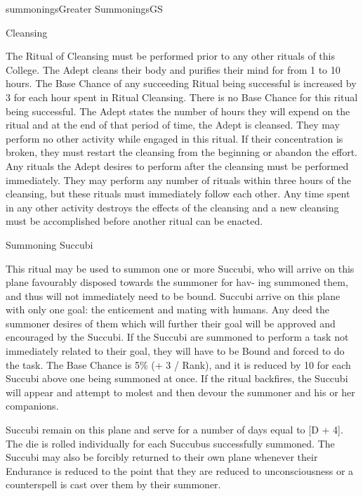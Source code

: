 \begin{College}[1.0]{summonings}{Greater Summonings}{GS}
\begin{ritual}[Q-1]{Cleansing}
\begin{effects}
The Ritual of Cleansing must be performed prior to any other rituals
of this College.  The Adept cleans their body and purifies their mind
for from 1 to 10 hours.  The Base Chance of any succeeding Ritual
being successful is increased by 3 for each hour spent in Ritual
Cleansing. There is no Base Chance for this ritual being successful.
The Adept states the number of hours they will expend on the ritual
and at the end of that period of time, the Adept is cleansed. They may
perform no other activity while engaged in this ritual.  If their
concentration is broken, they must restart the cleansing from the
beginning or abandon the effort.  Any rituals the Adept desires to
perform after the cleansing must be performed immediately.  They may
perform any number of rituals within three hours of the cleansing, but
these rituals must immediately follow each other. Any time spent in
any other activity destroys the effects of the cleansing and a new
cleansing must be accomplished before another ritual can be enacted.
\end{effects}
\end{ritual}

\begin{ritual}[Q-2]{Summoning Succubi}

\begin{effects}
This ritual may be used to summon one or more Succubi, who will arrive
on this plane favourably disposed towards the summoner for hav- ing
summoned them, and thus will not immediately need to be bound. Succubi
arrive on this plane with only one goal: the enticement and mating
with humans.  Any deed the summoner desires of them which will further
their goal will be approved and encouraged by the Succubi.  If the
Succubi are summoned to perform a task not immediately related to
their goal, they will have to be Bound and forced to do the task. The
Base Chance is 5\% (+ 3 / Rank), and it is reduced by 10 for each
Succubi above one being summoned at once.  If the ritual backfires,
the Succubi will appear and attempt to molest and then devour the
summoner and his or her companions.

Succubi remain on this plane and serve for a number of days equal to
[D + 4]. The die is rolled individually for each Succubus successfully
summoned. The Succubi may also be forcibly returned to their own plane
whenever their Endurance is reduced to the point that they are reduced
to unconsciousness or a counterspell is cast over them by their
summoner.


\end{effects}
\end{ritual}
\end{College}
